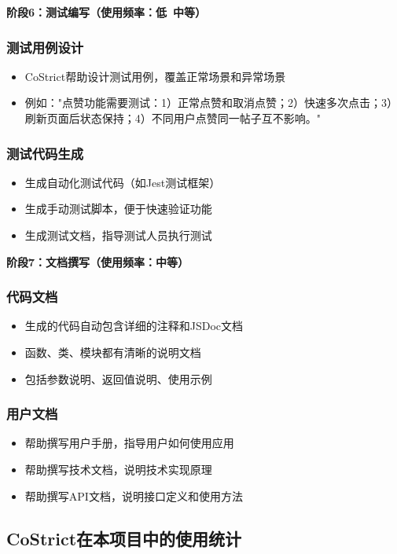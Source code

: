\documentclass[12pt,a4paper]{article}
\begin{document}
\textbf{阶段6：测试编写（使用频率：低~中等）}

\subsubsection{测试用例设计}
\begin{itemize}
    \item CoStrict帮助设计测试用例，覆盖正常场景和异常场景
    \item 例如："点赞功能需要测试：1）正常点赞和取消点赞；2）快速多次点击；3）刷新页面后状态保持；4）不同用户点赞同一帖子互不影响。"
\end{itemize}

\subsubsection{测试代码生成}
\begin{itemize}
    \item 生成自动化测试代码（如Jest测试框架）
    \item 生成手动测试脚本，便于快速验证功能
    \item 生成测试文档，指导测试人员执行测试
\end{itemize}

\textbf{阶段7：文档撰写（使用频率：中等）}

\subsubsection{代码文档}
\begin{itemize}
    \item 生成的代码自动包含详细的注释和JSDoc文档
    \item 函数、类、模块都有清晰的说明文档
    \item 包括参数说明、返回值说明、使用示例
\end{itemize}

\subsubsection{用户文档}
\begin{itemize}
    \item 帮助撰写用户手册，指导用户如何使用应用
    \item 帮助撰写技术文档，说明技术实现原理
    \item 帮助撰写API文档，说明接口定义和使用方法
\end{itemize}

\subsection{CoStrict在本项目中的使用统计}
\end{document}
